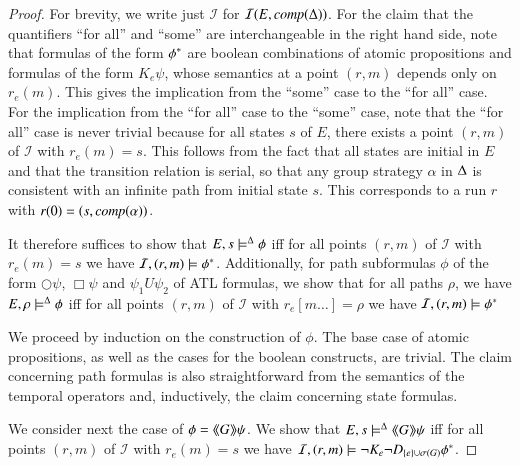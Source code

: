 \documentclass[a4wide]{article}
\newcommand{\until}{U}
\theoremstyle{examplesty}
\newcommand{\strat}{\sigma}
\newcommand{\I}{\mathcal{I}}
\newcommand{\atlop}[1]{\langle\hspace{-2pt}\langle #1 \rangle \hspace{-2pt}\rangle }
\newcommand{\Env}{E}
\newcommand{\nxt}{\Circle}
\newcommand{\always}{\Box}
\newcommand{\sgy}{\alpha}
\begin{document}
\begin{proof} 
For brevity, we write just $\I$ for $\I(\Env,\compl{\GStrats}) $.
For the claim that the quantifiers ``for all'' and ``some'' are interchangeable in the 
right hand side, note that formulas of the form $\phi^*$ are boolean combinations 
of atomic 
propositions 
and formulas of the form 
$K_e\psi$, whose semantics  at 
a point $(r,m)$ depends only on $r_e(m)$. 
This gives the implication from the ``some'' case to the 
``for all'' case. For the implication from the ``for all'' case to the ``some'' case, note that the 
``for all'' case is never trivial because for all states $s$ of $\Env$, there exists 
a point $(r,m)$ of $\I$ with $r_e(m) = s$. This follows from the fact that all states are initial in 
$\Env$ and that the transition relation is serial, so that any group strategy $\sgy$ in $\Delta$ is consistent with  
an infinite path from initial state $s$.  This corresponds to a run $r$ with $r(0) = (s,\compl{\sgy})$. 

It therefore suffices to show that $\Env, s \models^\GStrats \phi$ iff for all  points $(r,m)$ of  
$\I$ with $r_e(m) = s$ we have $\I, (r,m)\models \trl{\phi}$.  
Additionally, for path subformulas $\phi$ of the  form $\nxt \psi$, $\always \psi$ and $\psi_1 \until \psi_2$ of ATL formulas, we show that 
for all paths $\rho$, we have $\Env, \rho \models^\GStrats \phi$ iff for all  points $(r,m)$ of  
$\I$ with $r_e[m \ldots] = \rho$ we have $\I, (r,m)\models \trl{\phi}$

We proceed by induction on the construction of $\phi$. 
The base case of atomic propositions, as well as the cases for the boolean constructs,  
are trivial. 
The claim concerning path formulas is also straightforward from the semantics of the 
temporal operators and, inductively, the claim concerning state formulas. 

We consider next the case of  $\phi = \atlop{G} \psi$. 
We show that  $\Env, s \models^\GStrats \atlop{G}\psi$ iff 
for all  points $(r,m)$ of  $\I$ with $r_e(m) = s$ we have $\I, (r,m)\models \neg K_e \neg D_{\{e\} \cup \strat(G)}  \trl{\phi}$. 


\end{proof}
\end{document}
